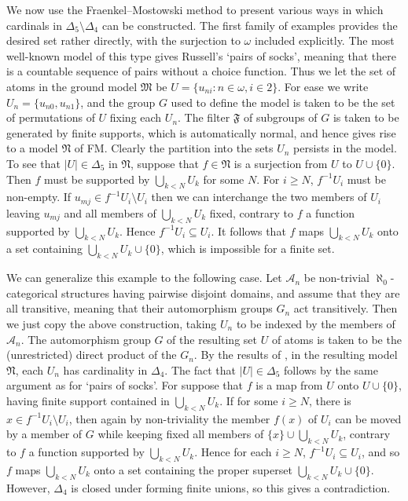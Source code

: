 \documentclass[a4paper,reqno]{amsart}
\numberwithin{equation}{section}
\begin{document}
We now use the Fraenkel--Mostowski method to present various ways in which cardinals in $\Delta_5 \setminus \Delta_4$ 
can be constructed. The first family of examples provides the desired set rather directly, with the surjection to $\omega$
included explicitly. The most well-known model of this type gives Russell's `pairs of socks', meaning that there is a
countable sequence of pairs without a choice function. Thus we let the set of atoms in the ground model $\mathfrak M$
be $U = \{u_{ni}: n \in \omega, i \in 2\}$. For ease we write $U_n = \{u_{n0}, u_{n1}\}$, and the group $G$ used to 
define the model is taken to be the set of permutations of $U$ fixing each $U_n$. The filter $\mathfrak F$ of subgroups of
$G$ is taken to be generated by finite supports, which is automatically normal,
and hence gives rise to a model $\mathfrak N$ of FM. Clearly the partition into the sets $U_n$ persists in the model. To
see that $|U| \in \Delta_5$ in $\mathfrak N$, suppose that $f \in {\mathfrak N}$ is a surjection from $U$ to 
$U \cup \{0\}$. Then $f$ must be supported by $\bigcup_{k < N}U_k$ for some $N$. For $i \ge N$, $f^{-1}U_i$ must be 
non-empty. If $u_{mj} \in f^{-1}U_i \setminus U_i$ then we can interchange the two members of $U_i$ leaving $u_{mj}$
and all members of $\bigcup_{k < N}U_k$ fixed, contrary to $f$ a function supported by $\bigcup_{k < N}U_k$. Hence
$f^{-1}U_i \subseteq U_i$. It follows that $f$ maps $\bigcup_{k < N}U_k$ onto a set containing 
$\bigcup_{k < N}U_k \cup \{0\}$, which is impossible for a finite set.  

We can generalize this example to the following case. Let ${\mathcal A}_n$ be non-trivial $\aleph_0$-categorical structures 
having pairwise disjoint domains, and assume that they are all transitive, meaning that their automorphism groups $G_n$
act transitively. Then we just copy the above construction, taking $U_n$ to be indexed by the members of ${\mathcal A}_n$. 
The automorphism group $G$ of the resulting set $U$ of atoms is taken to be the (unrestricted) direct product 
of the $G_n$. By the results of \cite{Walczak}, in the resulting model $\mathfrak N$, each $U_n$ has cardinality in
$\Delta_4$. The fact that $|U| \in \Delta_5$ follows by the same argument as for `pairs of socks'. For suppose that $f$ 
is a map from $U$ onto $U \cup \{0\}$, having finite support contained in $\bigcup_{k < N}U_k$. If for some $i \ge N$,
there is $x \in f^{-1}U_i \setminus U_i$, then again by non-triviality the member $f(x)$ of $U_i$ can be moved by a member 
of $G$ while keeping fixed all members of $\{x\} \cup \bigcup_{k < N}U_k$, contrary to $f$ a function supported by 
$\bigcup_{k < N}U_k$. Hence for each $i \ge N$, $f^{-1}U_i \subseteq U_i$, and so $f$ maps $\bigcup_{k < N}U_k$ onto 
a set containing the proper superset $\bigcup_{k < N}U_k \cup \{0\}$. However, $\Delta_4$ is closed under forming 
finite unions, so this gives a contradiction.
\end{document}
